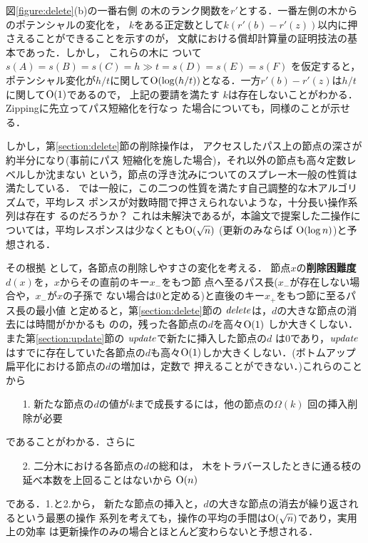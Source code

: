 \documentclass{compsoft}
\begin{document}
図\ref{figure:delete}(b)の一番右側
の木のランク関数を$r'$とする．一番左側の木からのポテンシャルの変化を，
$k$をある正定数として$k(r'(b)-r'(z))$以内に押さえることができることを示すのが，
文献\Cite{ST85}における償却計算量の証明技法の基本であった．しかし，
これらの木に
ついて$s(A)= s(B) = s(C) = h\gg t = s(D) = s(E) = s(F)$
を仮定すると，ポテンシャル変化が$h/t$に関して${\rm O}(\log
(h/t))$となる．一方$r'(b)-r'(z)$は$h/t$に関して${\rm O}(1)$であるので，
上記の要請を満たす
$k$は存在しないことがわかる．Zippingに先立ってパス短縮化を行なっ
た場合についても，同様のことが示せる．

しかし，第\ref{section:delete}節の削除操作は，
%
アクセスしたパス上の節点の深さが約半分になり(事前にパス
短縮化を施した場合)，それ以外の節点も高々定数レベルしか沈まない
%
という，節点の浮き沈みについてのスプレー木一般の性質は満たしている．
%
では一般に，この二つの性質を満たす自己調整的な木アルゴリズムで，平均レス
ポンスが対数時間で押さえられないような，十分長い操作系列は存在す
るのだろうか？ これは未解決であるが，本論文で提案した二操作に
ついては，平均レスポンスは少なくとも${\rm O}(\sqrt n)$ (更新のみならば
${\rm O}(\log n)$)と予想される．

その根拠
として，各節点の削除しやすさの変化を考える．
節点$x$の{\bf 削除困難度}$d(x)$を，$x$からその直前のキー$x_-$をもつ節
点へ至るパス長($x_-$が存在しない場合や，$x_-$が$x$の子孫で
ない場合は$0$と定める)と直後のキー$x_+$をもつ節に至るパス長の最小値
と定めると，第\ref{section:delete}節の
${\it delete\/}$は，$d$の大きな節点の消去には時間がかかるも
のの，残った各節点の$d$を高々${\rm O}(1)$
しか大きくしない．また第\ref{section:update}節の
${\it update\/}$で新たに挿入した節点の$d$
は$0$であり，${\it update\/}$はすでに存在していた各節点の$d$も高々${\rm
O}(1)$しか大きくしない．(ボトムアップ扁平化における節点の$d$の増加は，定数で
押えることができない．)これらのことから
%
\begin{enumerate}
\item[1.]
新たな節点の$d$の値が$k$まで成長するには，他の節点の$\Omega(k)$
回の挿入削除が必要
\end{enumerate}
%
であることがわかる．さらに
%
\begin{enumerate}
\item[2.]
二分木における各節点の$d$の総和は，
木をトラバースしたときに通る枝の延べ本数を上回ることはないから
${\rm O}(n)$
\end{enumerate}
%
である．1.と2.から，
新たな節点の挿入と，$d$の大きな節点の消去が繰り返されるという最悪の操作
系列を考えても，操作の平均の手間は${\rm O}(\sqrt n)$であり，実用上の効率
は更新操作のみの場合とほとんど変わらないと予想される．
\end{document}
